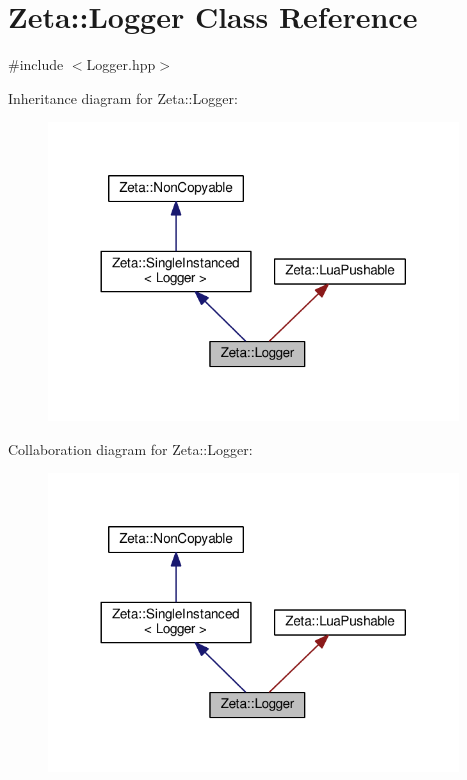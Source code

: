 \hypertarget{classZeta_1_1Logger}{\section{Zeta\+:\+:Logger Class Reference}
\label{classZeta_1_1Logger}
}


{\ttfamily \#include $<$Logger.\+hpp$>$}



Inheritance diagram for Zeta\+:\+:Logger\+:\nopagebreak
\begin{figure}[H]
\begin{center}
\leavevmode
\includegraphics[width=308pt]{classZeta_1_1Logger__inherit__graph}
\end{center}
\end{figure}


Collaboration diagram for Zeta\+:\+:Logger\+:\nopagebreak
\begin{figure}[H]
\begin{center}
\leavevmode
\includegraphics[width=308pt]{classZeta_1_1Logger__coll__graph}
\end{center}
\end{figure}
